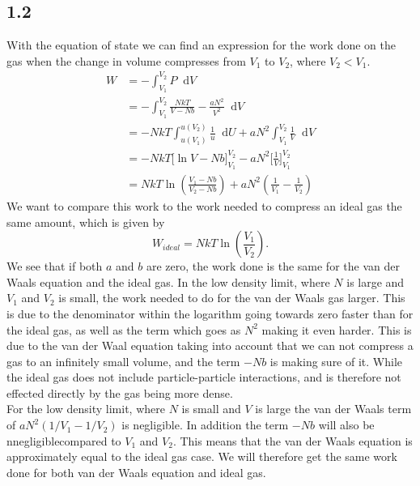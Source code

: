 \documentclass[a4paper,10pt, english]{article}
\newcommand*\diff{\mathop{}\!\mathrm{d}}
\begin{document}
\subsection*{1.2}
With the equation of state we can find an expression for the work done on the gas when the change in volume compresses from $V_1$ to $V_2$, where $V_2<V_1$.
\begin{align*}
    W &= -\int_{V_1}^{V_2}P \diff V \\
      &= -\int_{V_1}^{V_2} \frac{NkT}{V-Nb} - \frac{aN^2}{V^2} \diff V \\
      &= -NkT \int_{u(V_1)}^{u(V_2)}\frac{1}{u}\diff U  + aN^2\int_{V_1}^{V_2}\frac{1}{V}\diff V \\
      &= -NkT\Bigg[\ln{V-Nb}\Bigg]_{V_1}^{V_2}-aN^2\Bigg[\frac{1}{V}\Bigg]_{V_1}^{V_2} \\
      &= NkT\ln{\left(\frac{V_1-Nb}{V_2-Nb}\right)}+aN^2\left(\frac{1}{V_1}-\frac{1}{V_2}\right)
\end{align*}
We want to compare this work to the work needed to compress an ideal gas the same amount, which is given by
\begin{equation}
    W_{ideal} = NkT\ln{\left(\frac{V_1}{V_2}\right)}.
\end{equation}
We see that if both $a$ and $b$ are zero, the work done is the same for the van der Waals equation and the ideal gas. In the low density limit, where $N$ is large and $V_1$ and $V_2$ is small, the work needed to do for the van der Waals gas larger. This is due to the denominator within the logarithm going towards zero faster than for the ideal gas, as well as the term which goes as $N^2$ making it even harder. This is due to the van der Waal equation taking into account that we can not compress a gas to an infinitely small volume, and the term $-Nb$ is making sure of it. While the ideal gas does not include particle-particle interactions, and is therefore not effected directly by the gas being more dense. \\
For the low density limit, where $N$ is small and $V$ is large the van der Waals term of $aN^2(1/V_1-1/V_2)$ is negligible. In addition the term $-Nb$ will also be nnegligiblecompared to $V_1$ and $V_2$. This means that the van der Waals equation is approximately equal to the ideal gas case. We will therefore get the same work done for both van der Waals equation and ideal gas.
\end{document}
